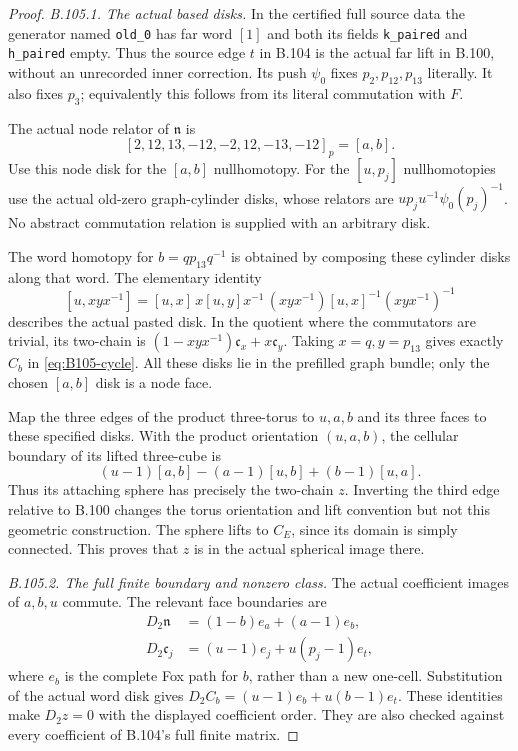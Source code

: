 \begin{proof}
\emph{B.105.1. The actual based disks.}
In the certified full source data the generator named
\texttt{old\_0} has far word $[1]$ and both its fields
\texttt{k\_paired} and \texttt{h\_paired} empty. Thus the source
edge $t$ in B.104 is the actual far lift in B.100, without an
unrecorded inner correction. Its push $\psi_0$ fixes
$p_2,p_{12},p_{13}$ literally. It also fixes $p_3$; equivalently
this follows from its literal commutation with $F$.

The actual node relator of $\mathfrak n$ is
\[
 [2,12,13,-12,-2,12,-13,-12]_p=[a,b].
\]
Use this node disk for the $[a,b]$ nullhomotopy. For the
$[u,p_j]$ nullhomotopies use the actual old-zero graph-cylinder
disks, whose relators are
$u p_j u^{-1}\psi_0(p_j)^{-1}$.
No abstract commutation relation is supplied with an arbitrary disk.

The word homotopy for $b=q p_{13}q^{-1}$ is obtained by composing
these cylinder disks along that word. The elementary identity
\[
 [u,xyx^{-1}]=[u,x]\,
       x[u,y]x^{-1}\,
       (xyx^{-1})[u,x]^{-1}(xyx^{-1})^{-1}
\]
describes the actual pasted disk. In the quotient where the
commutators are trivial, its two-chain is
$(1-xyx^{-1})\mathfrak c_x+x\mathfrak c_y$.
Taking $x=q,y=p_{13}$ gives exactly $C_b$ in
\eqref{eq:B105-cycle}. All these disks lie in the prefilled
graph bundle; only the chosen $[a,b]$ disk is a node face.

Map the three edges of the product three-torus to $u,a,b$ and
its three faces to these specified disks. With the product
orientation $(u,a,b)$, the cellular boundary of its lifted
three-cube is
\[
 (u-1)[a,b]-(a-1)[u,b]+(b-1)[u,a].
\]
Thus its attaching sphere has precisely the two-chain $z$.
Inverting the third edge relative to B.100 changes the torus
orientation and lift convention but not this geometric construction.
The sphere lifts to $C_E$, since its domain is simply connected.
This proves that $z$ is in the actual spherical image there.

\emph{B.105.2. The full finite boundary and nonzero class.}
The actual coefficient images of $a,b,u$ commute. The relevant
face boundaries are
\[
 \begin{aligned}
 D_2\mathfrak n&=(1-b)e_a+(a-1)e_b,\\
 D_2\mathfrak c_j&=(u-1)e_j+u(p_j-1)e_t,
 \end{aligned}
\]
where $e_b$ is the complete Fox path for $b$, rather than a new
one-cell. Substitution of the actual word disk gives
$D_2C_b=(u-1)e_b+u(b-1)e_t$. These identities make
$D_2z=0$ with the displayed coefficient order. They are also
checked against every coefficient of B.104's full finite matrix.


\end{proof}
